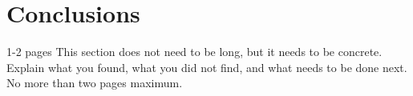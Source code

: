 \cleardoublepage%
\chapter{\label{chap:con}Conclusions}%
1-2 pages
This section does not need to be long, but it needs to be concrete. Explain what you found, what you did not find, and what needs to be done next. No more than two pages maximum. 